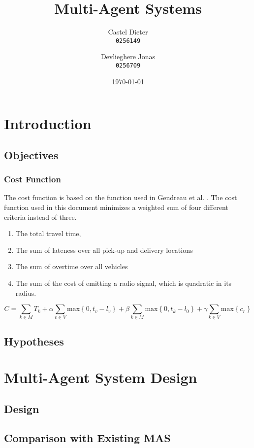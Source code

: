 \documentclass[11pt,a4paper,oneside]{article}
\title{Multi-Agent Systems}
\author{
  Castel Dieter\\
  \texttt{0256149}
  \and
  Devlieghere Jonas\\
  \texttt{0256709}
}
\date{\today}
\begin{document}
\maketitle
\tableofcontents
\listoffigures
\listoftables
\newpage

\section{Introduction}
\subsection{Objectives}
\subsubsection{Cost Function}
The cost function is based on the function used in Gendreau et al. \cite{gendreau2006neighborhood}. The cost function used in this document minimizes a weighted sum of four different criteria instead of three.
\begin{enumerate}
	\item The total travel time,
	\item The sum of lateness over all pick-up and delivery locations
	\item The sum of overtime over all vehicles
	\item The sum of the cost of emitting a radio signal, which is quadratic in its radius.
\end{enumerate}

$$
C = \sum_{k \in M}{T_k} + \alpha \sum_{v \in V} \text{max} \left\{ 0, t_v - l_v \right\} + \beta \sum_{k \in M} \text{max} \left\{0, t_k - l_0 \right\} + \gamma \sum_{k \in V} \text{max} \left\{ c_r \right\}
$$

\subsection{Hypotheses}

\section{Multi-Agent System Design}
\subsection{Design}
\subsection{Comparison with Existing MAS}
\end{document}
